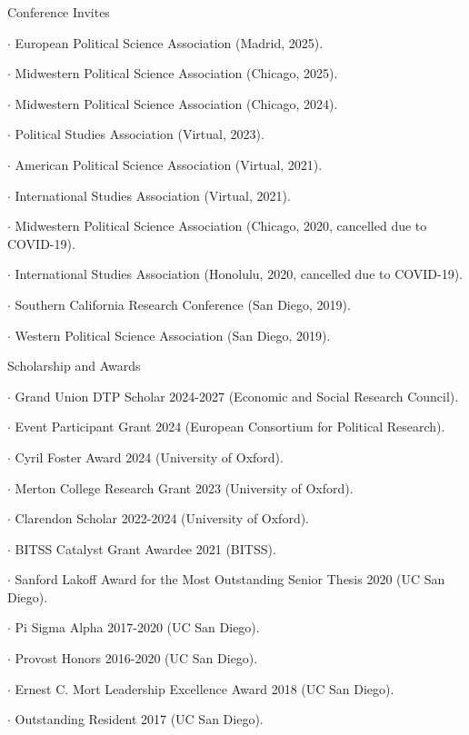 \documentclass[10pt]{resume} %
\begin{document}
	\begin{rSection}{Conference Invites}
		\itemsep -5pt
		\item $\cdot$ European Political Science Association (Madrid, 2025).
		\item $\cdot$ Midwestern Political Science Association (Chicago, 2025).
		\item $\cdot$ Midwestern Political Science Association (Chicago, 2024).
		\item $\cdot$ Political Studies Association (Virtual, 2023).
		\item $\cdot$ American Political Science Association (Virtual, 2021).
		\item $\cdot$ International Studies Association (Virtual, 2021).
		\item $\cdot$ Midwestern Political Science Association (Chicago, 2020, cancelled due to COVID-19).
		\item $\cdot$ International Studies Association (Honolulu, 2020, cancelled due to COVID-19).
		\item $\cdot$ Southern California Research Conference (San Diego, 2019).
		\item $\cdot$ Western Political Science Association (San Diego, 2019).
	\end{rSection}
	
	\begin{rSection}{Scholarship and Awards}
		\itemsep -5pt
		\item $\cdot$ Grand Union DTP Scholar 2024-2027 (Economic and Social Research Council).
		\item $\cdot$ Event Participant Grant 2024 (European Consortium for Political Research).
		\item $\cdot$ Cyril Foster Award 2024 (University of Oxford).
		\item $\cdot$ Merton College Research Grant 2023 (University of Oxford).
		\item $\cdot$ Clarendon Scholar 2022-2024 (University of Oxford).
		\item $\cdot$ BITSS Catalyst Grant Awardee 2021 (BITSS).
		\item $\cdot$ Sanford Lakoff Award for the Most Outstanding Senior Thesis 2020 (UC San Diego).
		\item $\cdot$ Pi Sigma Alpha 2017-2020 (UC San Diego). 
		\item $\cdot$ Provost Honors 2016-2020 (UC San Diego). 
		\item $\cdot$ Ernest C. Mort Leadership Excellence Award 2018 (UC San Diego). 
		\item $\cdot$ Outstanding Resident 2017 (UC San Diego).
	\end{rSection}
	
\end{document}
